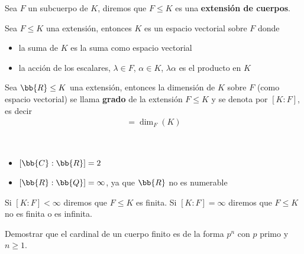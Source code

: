 \begin{definicion}
    Sea $F$ un subcuerpo de $K$, diremos que $F\leq K$ es una \textbf{extensión de cuerpos}.
\end{definicion}

\begin{observacion}
    Sea $F\leq K$ una extensión, entonces $K$ es un espacio vectorial sobre $F$ donde 
    \begin{itemize}
        \item  la suma de $K$ es la suma como espacio vectorial
        \item la acción de los escalares, $\lambda \in F$, $\alpha \in K$,  $\lambda\alpha$ es el producto en $K$
    \end{itemize} 
\end{observacion}

\begin{definicion}
    Sea $\bb{R}\leq K$ una extensión, entonces la dimensión de $K$ sobre $F$ (como espacio vectorial) se llama \textbf{grado} de la extensión $F\leq K$ y se denota por $[K:F]$, es decir
    \begin{gather*}
        [K:F] = \dim_F(K)
    \end{gather*}
\end{definicion}

\begin{ejemplo}\
    \begin{itemize}
        \item $[\bb{C}: \bb{R}] = 2$
        \item $[\bb{R}: \bb{Q}] = \infty$, ya que $\bb{R}$ no es numerable
    \end{itemize}
\end{ejemplo}

\begin{notacion}
    Si $[K:F]<\infty$ diremos que $F\leq K$ es finita. Si $[K:F]=\infty$ diremos que $F\leq K$ no es finita o es infinita.
\end{notacion}

\begin{ejercicio}
    Demostrar que el cardinal de un cuerpo finito es de la forma $p^n$ con $p$ primo y $n\geq 1$.

\end{ejercicio}

